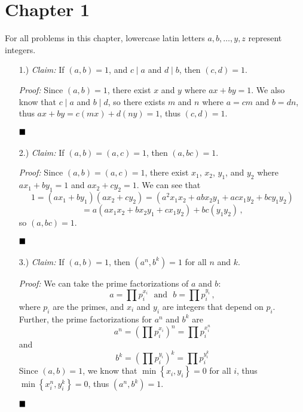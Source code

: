 \documentclass[12pt]{article}
\newcommand{\claim}{\textit{Claim: }}
\newcommand{\proof}{\textit{Proof: }}
\newcommand{\done}{
    \ensuremath{\strut\hfill\blacksquare}
}
\newcommand{\sep}[1]{\ \ \ \text{#1}\ \ \ }
\newcommand{\braces}[1]{\left\{#1\right\}}
\newcommand{\parens}[1]{\left(#1\right)}
\begin{document}
    \pagestyle{fancy}

    \section*{Chapter 1}

    For all problems in this chapter, lowercase latin letters $a,b,\dots,y,z$
    represent integers.
    
    \begin{itemize}
        \item [1.)] \claim If $(a,b)=1$, and $c\mid a$ and $d\mid b$, then
        $(c,d)=1$.
        
        \proof Since $(a,b)=1$, there exist $x$ and $y$ where $ax+by=1$.
        We also know that $c\mid a $ and $b\mid d$, so there exists $m$ and
        $n$ where $a=cm$ and $b=dn$, thus $ax+by=c(mx)+d(ny)=1$, thus
        $(c,d)=1$.
        \done

        \item [2.)] \claim If $(a,b)=(a,c)=1$, then $(a,bc)=1$.

        \proof Since $(a,b)=(a,c)=1$, there exist $x_1$, $x_2$, $y_1$, and
        $y_2$ where $ax_1+by_1=1$ and $ax_2+cy_2=1$.
        We can see that
        \[
            1 = (ax_1+by_1)(ax_2+cy_2)
            = (a^2x_1x_2+abx_2y_1+acx_1y_2+bcy_1y_2)
        \]\[
            = a(ax_1x_2+bx_2y_1+cx_1y_2)+bc(y_1y_2)
            \, ,
        \]
        so $(a,bc)=1$.
        \done

        \item [3.)] \claim If $(a,b) = 1$, then $(a^n,b^k) = 1$ for all $n$ and $k$.
        
        \proof We can take the prime factorizations of $a$ and $b$:
        \[
            a
            = \prod p_i^{x_i}
            \sep{and}
            b
            = \prod p_i^{y_i}
            \, ,
        \]
        where $p_i$ are the primes, and $x_i$ and $y_i$ are integers that
        depend on $p_i$.
        Further, the prime factorizations for $a^n$ and $b^k$ are
        \[
            a^n
            = \parens{\prod p_i^{x_i}}^n
            = \prod p_i^{x_i^n}
        \]
        and
        \[
            b^k
            = \parens{\prod p_i^{y_i}}^k
            = \prod p_i^{y_i^k}
        \]
        Since $(a,b)=1$, we know that $\min \braces{x_i,y_i}=0$ for all $i$,
        thus $\min \braces{x_i^n,y_i^k}=0$, thus $(a^n,b^k)=1$.
        \done


\end{itemize}
\end{document}
